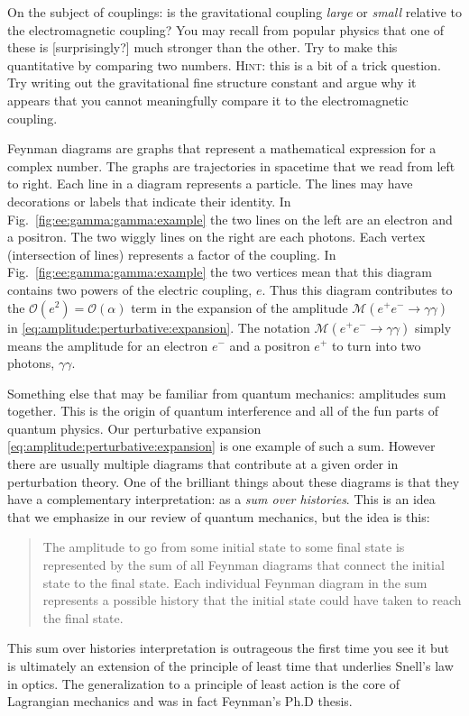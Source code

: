 \documentclass[12pt, oneside]{report}    %
\begin{document}
\begin{exercise}
On the subject of couplings: is the gravitational coupling \emph{large} or \emph{small} relative to the electromagnetic coupling? You may recall from popular physics that one of these is [surprisingly?] much stronger than the other. Try to make this quantitative by comparing two numbers. \textsc{Hint}: this is a bit of a trick question. Try writing out the gravitational fine structure constant and argue why it appears that you cannot meaningfully compare it to the electromagnetic coupling.
\end{exercise}

Feynman diagrams are graphs that represent a mathematical expression for a complex number. The graphs are trajectories in spacetime that we read from left to right. Each line in a diagram represents a particle. The lines may have decorations or labels that indicate their identity. In Fig.~\ref{fig:ee:gamma:gamma:example} the two lines on the left are an electron and a positron. The two wiggly lines on the right are each photons. Each vertex (intersection of lines) represents a factor of the coupling. In Fig.~\ref{fig:ee:gamma:gamma:example} the two vertices mean that this diagram contains two powers of the electric coupling, $e$. Thus this diagram contributes to the $\mathcal O(e^2) = \mathcal O(\alpha)$ term in the expansion of the amplitude $\mathcal M(e^+e^-\to \gamma\gamma)$ in \eqref{eq:amplitude:perturbative:expansion}. The notation $\mathcal M(e^+e^-\to \gamma\gamma)$ simply means the amplitude for an electron $e^-$ and a positron $e^+$ to turn into two photons, $\gamma\gamma$.

Something else that may be familiar from quantum mechanics: amplitudes sum together. This is the origin of quantum interference and all of the fun parts of quantum physics. Our perturbative expansion \eqref{eq:amplitude:perturbative:expansion} is one example of such a sum. However there are usually multiple diagrams that contribute at a given order in perturbation theory. One of the brilliant things about these diagrams is that they have a complementary interpretation: as a \emph{sum over histories}. This is an idea that we emphasize in our review of quantum mechanics, but the idea is this: 
\begin{quote}
The amplitude to go from some initial state to some final state is represented by the sum of all Feynman diagrams that connect the initial state to the final state. Each individual Feynman diagram in the sum represents a possible history that the initial state could have taken to reach the final state.
\end{quote}
This sum over histories interpretation is outrageous the first time you see it but is ultimately an extension of the principle of least time that underlies Snell's law in optics. The generalization to a principle of least action is the core of Lagrangian mechanics and was in fact Feynman's Ph.D thesis\autocite{feynman2005feynman}. 
\end{document}
